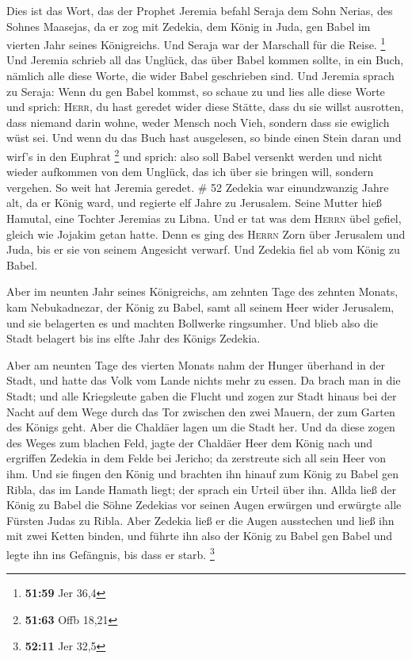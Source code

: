  Dies ist das Wort, das der Prophet Jeremia befahl Seraja
dem Sohn Nerias, des Sohnes Maasejas, da er zog mit Zedekia, dem König
in Juda, gen Babel im vierten Jahr seines Königreichs. Und Seraja war
der Marschall für die Reise. \footnote{\textbf{51:59} Jer 36,4}
 Und Jeremia schrieb all das Unglück, das über Babel
kommen sollte, in ein Buch, nämlich alle diese Worte, die wider Babel
geschrieben sind.  Und Jeremia sprach zu Seraja: Wenn du
gen Babel kommst, so schaue zu und lies alle diese Worte 
und sprich: \textsc{Herr}, du hast geredet wider diese Stätte, dass du
sie willst ausrotten, dass niemand darin wohne, weder Mensch noch Vieh,
sondern dass sie ewiglich wüst sei.  Und wenn du das Buch
hast ausgelesen, so binde einen Stein daran und wirf's in den Euphrat
\footnote{\textbf{51:63} Offb 18,21}  und sprich: also
soll Babel versenkt werden und nicht wieder aufkommen von dem Unglück,
das ich über sie bringen will, sondern vergehen. So weit hat Jeremia
geredet. \# 52  Zedekia war einundzwanzig Jahre alt, da er
König ward, und regierte elf Jahre zu Jerusalem. Seine Mutter hieß
Hamutal, eine Tochter Jeremias zu Libna.  Und er tat was
dem \textsc{Herrn} übel gefiel, gleich wie Jojakim getan hatte.
 Denn es ging des \textsc{Herrn} Zorn über Jerusalem und
Juda, bis er sie von seinem Angesicht verwarf. Und Zedekia fiel ab vom
König zu Babel.

 Aber im neunten Jahr seines Königreichs, am zehnten Tage
des zehnten Monats, kam Nebukadnezar, der König zu Babel, samt all
seinem Heer wider Jerusalem, und sie belagerten es und machten Bollwerke
ringsumher.  Und blieb also die Stadt belagert bis ins
elfte Jahr des Königs Zedekia.

 Aber am neunten Tage des vierten Monats nahm der Hunger
überhand in der Stadt, und hatte das Volk vom Lande nichts mehr zu
essen.  Da brach man in die Stadt; und alle Kriegsleute
gaben die Flucht und zogen zur Stadt hinaus bei der Nacht auf dem Wege
durch das Tor zwischen den zwei Mauern, der zum Garten des Königs geht.
Aber die Chaldäer lagen um die Stadt her.  Und da diese
zogen des Weges zum blachen Feld, jagte der Chaldäer Heer dem König nach
und ergriffen Zedekia in dem Felde bei Jericho; da zerstreute sich all
sein Heer von ihm.  Und sie fingen den König und brachten
ihn hinauf zum König zu Babel gen Ribla, das im Lande Hamath liegt; der
sprach ein Urteil über ihn.  Allda ließ der König zu
Babel die Söhne Zedekias vor seinen Augen erwürgen und erwürgte alle
Fürsten Judas zu Ribla.  Aber Zedekia ließ er die Augen
ausstechen und ließ ihn mit zwei Ketten binden, und führte ihn also der
König zu Babel gen Babel und legte ihn ins Gefängnis, bis dass er starb.
\footnote{\textbf{52:11} Jer 32,5}

